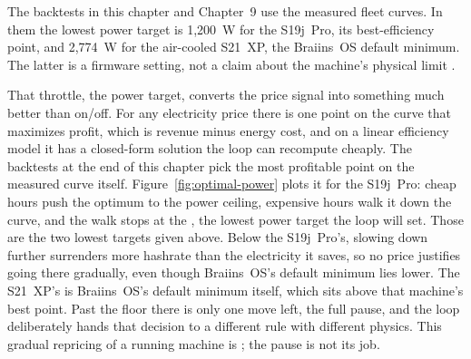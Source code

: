 The backtests in this chapter and Chapter~9 use the measured fleet curves. In them the lowest power target is 1,200~W for the S19j~Pro, its best-efficiency point, and 2,774~W for the air-cooled S21~XP, the Braiins~OS default minimum. The latter is a firmware setting, not a claim about the machine's physical limit \autocite{braiinsacademytechres}. %

That throttle, the power target, converts the price signal into something much better than on/off. For any electricity price there is one point on the curve that maximizes profit, which is revenue minus energy cost, and on a linear efficiency model it has a closed-form solution the loop can recompute cheaply. The backtests at the end of this chapter pick the most profitable point on the measured curve itself. Figure~\ref{fig:optimal-power} plots it for the S19j~Pro: cheap hours push the optimum to the power ceiling, expensive hours walk it down the curve, and the walk stops at the , the lowest power target the loop will set. Those are the two lowest targets given above. Below the S19j~Pro's, slowing down further surrenders more hashrate than the electricity it saves, so no price justifies going there gradually, even though Braiins~OS's default minimum lies lower. The S21~XP's is Braiins~OS's default minimum itself, which sits above that machine's best point. Past the floor there is only one move left, the full pause, and the loop deliberately hands that decision to a different rule with different physics. This gradual repricing of a running machine is ; the pause is not its job.

